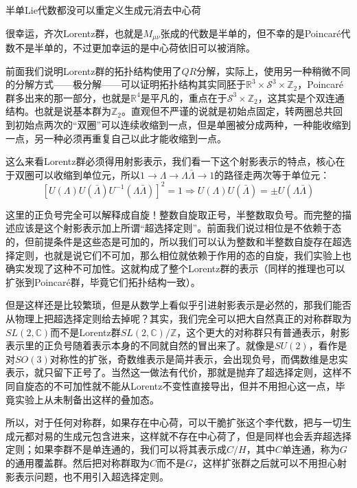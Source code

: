 \begin{theorem}
	半单Lie代数都没可以重定义生成元消去中心荷
\end{theorem}
很幸运，齐次Lorentz群，也就是$M_{\mu\nu}$张成的代数是半单的，但不幸的是Poincar\'e代数不是半单的，不过更加幸运的是中心荷依旧可以被消除。

前面我们说明Lorentz群的拓扑结构使用了$QR$分解，实际上，使用另一种稍微不同的分解方式——极分解——可以证明拓扑结构其实同胚于$\mathbb{R}^3\times\mathcal{S}^3\times\mathbb{Z}_2$，Poincar\'e群多出来的那一部分，也就是$\mathbb{R}^4$是平凡的，重点在于$\mathcal{S}^3\times\mathbb{Z}_2$，这其实是个双连通结构。也就是说基本群为$\mathbb{Z}_2$。直观但不严谨的说就是初始点固定，转两圈总共回到初始点两次的“双圈”可以连续收缩到一点，但是单圈被分成两种，一种能收缩到一点，另一种必须再重复自己以此才能收缩到一点。

这么来看Lorentz群必须得用射影表示，我们看一下这个射影表示的特点，核心在于双圈可以收缩到单位元，所以$1\to\Lambda\to\Lambda\bar\Lambda\to1$的路径走两次等于单位元：
\begin{equation}
	\left[U(\Lambda)U(\bar\Lambda)U^{-1}(\Lambda\bar\Lambda)\right]^2=1\Rightarrow U(\Lambda)U(\bar\Lambda)=\pm U(\Lambda\bar\Lambda)
\end{equation} 

这里的正负号完全可以解释成自旋！整数自旋取正号，半整数取负号。而完整的描述应该是这个射影表示加上所谓“超选择定则”。前面我们说过相位是不依赖于态的，但前提条件是这些态是可加的，所以我们可以认为整数和半整数自旋存在超选择定则，也就是说它们不可加，那么相位就依赖于作用的态的自旋，我们实验上也确实发现了这种不可加性。这就构成了整个Lorentz群的表示（同样的推理也可以扩张到Poincar\'e群，毕竟它们拓扑结构一致）。

但是这样还是比较繁琐，但是从数学上看似乎引进射影表示是必然的，那我们能否从物理上把超选择定则给去掉呢？其实，我们完全可以把大自然真正的对称群取为$SL(2,\mathbb{C})$而不是Lorentz群$SL(2,\mathbb{C})/\mathbb{Z}$，这个更大的对称群只有普通表示，射影表示里的正负号随着表示本身的不同就自然的冒出来了。就像是$SU(2)$，看作是对$SO(3)$对称性的扩张，奇数维表示是简并表示，会出现负号，而偶数维是忠实表示，就只留下正号了。当然这一做法有代价，那就是抛弃了超选择定则，这样不同自旋态的不可加性就不能从Lorentz不变性直接导出，但并不用担心这一点，毕竟实验上从未制备出这样的叠加态。

所以，对于任何对称群，如果存在中心荷，可以干脆扩张这个李代数，把与一切生成元都对易的生成元包含进来，这样就不存在中心荷了，但是同样也会丢弃超选择定则；如果李群不是单连通的，我们可以将其表示成$C/H$，其中$C$单连通，称为$G$的通用覆盖群。然后把对称群取为$C$而不是$G$，这样扩张群之后就可以不用担心射影表示问题，也不用引入超选择定则。
